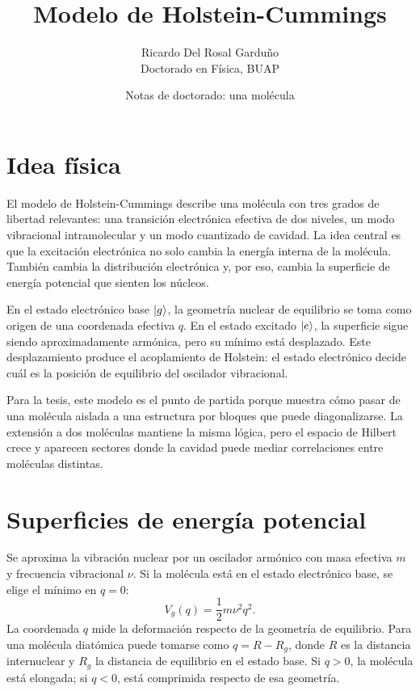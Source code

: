\documentclass[11pt]{article}
\title{Modelo de Holstein-Cummings}
\author{Ricardo Del Rosal Gardu\~no \\ \small Doctorado en F\'isica, BUAP}
\date{Notas de doctorado: una mol\'ecula}
\begin{document}
\maketitle

\tableofcontents
\bigskip

\section{Idea f\'isica}

El modelo de Holstein-Cummings describe una mol\'ecula con tres grados de
libertad relevantes: una transici\'on electr\'onica efectiva de dos niveles, un
modo vibracional intramolecular y un modo cuantizado de cavidad. La idea
central es que la excitaci\'on electr\'onica no solo cambia la energ\'ia
interna de la mol\'ecula. Tambi\'en cambia la distribuci\'on electr\'onica y,
por eso, cambia la superficie de energ\'ia potencial que sienten los n\'ucleos.

En el estado electr\'onico base $\ket{g}$, la geometr\'ia nuclear de equilibrio
se toma como origen de una coordenada efectiva $q$. En el estado excitado
$\ket{e}$, la superficie sigue siendo aproximadamente arm\'onica, pero su
m\'inimo est\'a desplazado. Este desplazamiento produce el acoplamiento de
Holstein: el estado electr\'onico decide cu\'al es la posici\'on de equilibrio
del oscilador vibracional.

Para la tesis, este modelo es el punto de partida porque muestra c\'omo pasar
de una mol\'ecula aislada a una estructura por bloques que puede
diagonalizarse. La extensi\'on a dos mol\'eculas mantiene la misma l\'ogica,
pero el espacio de Hilbert crece y aparecen sectores donde la cavidad puede
mediar correlaciones entre mol\'eculas distintas.

\section{Superficies de energ\'ia potencial}

Se aproxima la vibraci\'on nuclear por un oscilador arm\'onico con masa
efectiva $m$ y frecuencia vibracional $\nu$. Si la mol\'ecula est\'a en el
estado electr\'onico base, se elige el m\'inimo en $q=0$:
\begin{equation}
  V_g(q)=\frac{1}{2}m\nu^2q^2.
\end{equation}
La coordenada $q$ mide la deformaci\'on respecto de la geometr\'ia de
equilibrio. Para una mol\'ecula diat\'omica puede tomarse como
$q=R-R_g$, donde $R$ es la distancia internuclear y $R_g$ la distancia de
equilibrio en el estado base. Si $q>0$, la mol\'ecula est\'a elongada; si
$q<0$, est\'a comprimida respecto de esa geometr\'ia.
\end{document}

